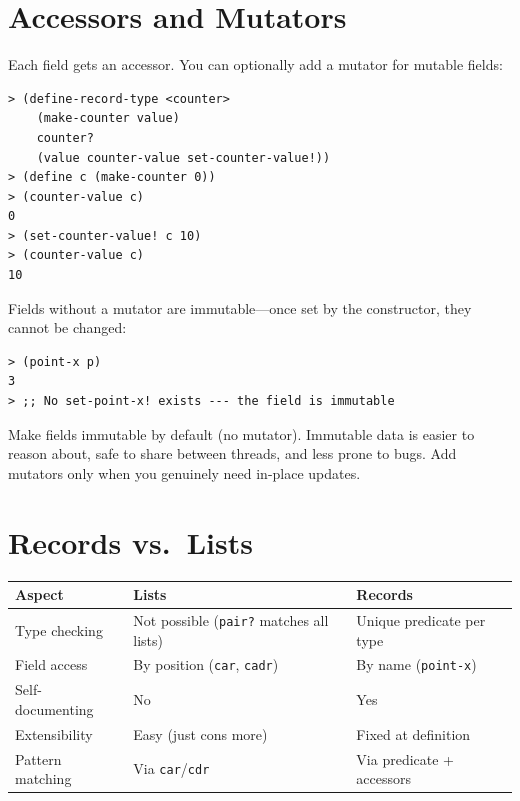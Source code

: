 \section{Accessors and Mutators}

Each field gets an accessor. You can optionally add a mutator for mutable fields:

\begin{lstlisting}[style=repl]
> (define-record-type <counter>
    (make-counter value)
    counter?
    (value counter-value set-counter-value!))
> (define c (make-counter 0))
> (counter-value c)
0
> (set-counter-value! c 10)
> (counter-value c)
10
\end{lstlisting}

Fields without a mutator are immutable---once set by the constructor, they cannot be changed:

\begin{lstlisting}[style=repl]
> (point-x p)
3
> ;; No set-point-x! exists --- the field is immutable
\end{lstlisting}

\begin{note}
Make fields immutable by default (no mutator). Immutable data is easier to reason about, safe to share between threads, and less prone to bugs. Add mutators only when you genuinely need in-place updates.
\end{note}

\section{Records vs.\ Lists}

\begin{center}
\begin{tabular}{lp{3.8cm}p{3.8cm}}
\textbf{Aspect} & \textbf{Lists} & \textbf{Records} \\
\hline
Type checking & Not possible (\texttt{pair?} matches all lists) & Unique predicate per type \\
Field access & By position (\texttt{car}, \texttt{cadr}) & By name (\texttt{point-x}) \\
Self-documenting & No & Yes \\
Extensibility & Easy (just cons more) & Fixed at definition \\
Pattern matching & Via \texttt{car}/\texttt{cdr} & Via predicate + accessors \\
\end{tabular}
\end{center}

